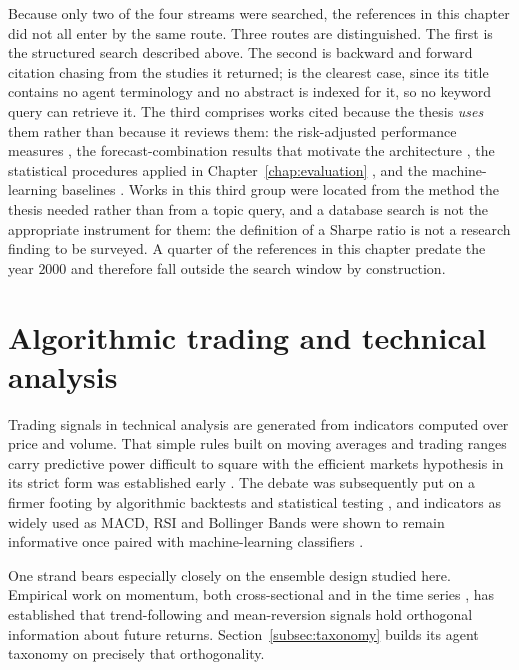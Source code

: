 Because only two of the four streams were searched, the references in this chapter did not all enter by the same route. Three routes are distinguished. The first is the structured search described above. The second is backward and forward citation chasing from the studies it returned; \cite{korczak2013} is the clearest case, since its title contains no agent terminology and no abstract is indexed for it, so no keyword query can retrieve it. The third comprises works cited because the thesis \emph{uses} them rather than because it reviews them: the risk-adjusted performance measures \cite{sharpe1966,sortino1994,young1991,martin1989}, the forecast-combination results that motivate the architecture \cite{batesgranger1969,clemen1989,timmermann2006}, the statistical procedures applied in Chapter~\ref{chap:evaluation} \cite{politis1994,pearson1896,spearman1904}, and the machine-learning baselines \cite{friedman2001,ke2017lightgbm}. Works in this third group were located from the method the thesis needed rather than from a topic query, and a database search is not the appropriate instrument for them: the definition of a Sharpe ratio is not a research finding to be surveyed. A quarter of the references in this chapter predate the year $2000$ and therefore fall outside the search window by construction.

\section{Algorithmic trading and technical analysis}\label{sec:sota_technical}

Trading signals in technical analysis are generated from indicators computed over price and volume. That simple rules built on moving averages and trading ranges carry predictive power difficult to square with the efficient markets hypothesis in its strict form was established early \cite{brock1992}. The debate was subsequently put on a firmer footing by algorithmic backtests and statistical testing \cite{boboc2013}, and indicators as widely used as MACD, RSI and Bollinger Bands were shown to remain informative once paired with machine-learning classifiers \cite{gerlein2016}.

One strand bears especially closely on the ensemble design studied here. Empirical work on momentum, both cross-sectional \cite{jegadeeshtitman1993,asness2013} and in the time series \cite{moskowitz2012}, has established that trend-following and mean-reversion signals hold orthogonal information about future returns. Section~\ref{subsec:taxonomy} builds its agent taxonomy on precisely that orthogonality.

